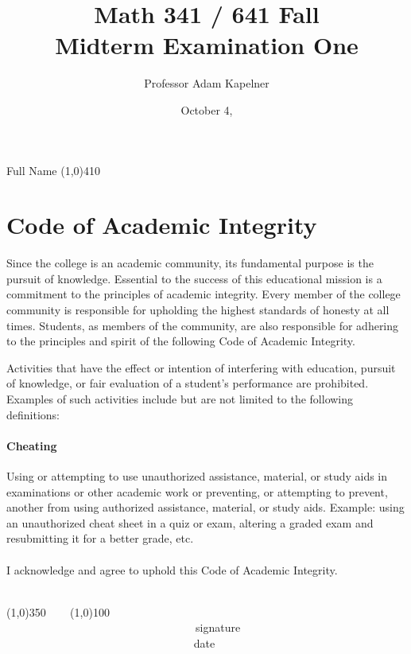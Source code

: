 \documentclass[12pt]{article}
\title{Math 341 / 641 Fall \the\year{} \\ Midterm Examination One}
\author{Professor Adam Kapelner}
\date{October 4, \the\year{}}
\begin{document}
\maketitle

\noindent Full Name \line(1,0){410}

\thispagestyle{empty}

\section*{Code of Academic Integrity}

\footnotesize
Since the college is an academic community, its fundamental purpose is the pursuit of knowledge. Essential to the success of this educational mission is a commitment to the principles of academic integrity. Every member of the college community is responsible for upholding the highest standards of honesty at all times. Students, as members of the community, are also responsible for adhering to the principles and spirit of the following Code of Academic Integrity.

Activities that have the effect or intention of interfering with education, pursuit of knowledge, or fair evaluation of a student's performance are prohibited. Examples of such activities include but are not limited to the following definitions:

\paragraph{Cheating} Using or attempting to use unauthorized assistance, material, or study aids in examinations or other academic work or preventing, or attempting to prevent, another from using authorized assistance, material, or study aids. Example: using an unauthorized cheat sheet in a quiz or exam, altering a graded exam and resubmitting it for a better grade, etc.\\
\\
\noindent I acknowledge and agree to uphold this Code of Academic Integrity. \\~\\

\begin{center}
\line(1,0){350} ~~~ \line(1,0){100}\\
~~~~~~~~~~~~~~~~~~~~~~~~~~~~~~~~~~signature~~~~~~~~~~~~~~~~~~~~~~~~~~~~~~~~~~~~~~~~~~~~~~~~~~~~~~~~~~~~~~ date
\end{center}

\normalsize
\end{document}
